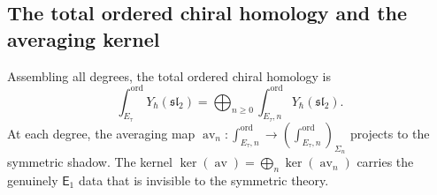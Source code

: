 \documentclass[11pt,reqno]{amsart}
\theoremstyle{definition}
\theoremstyle{remark}
\newcommand{\Eone}{\mathsf{E}_{1}}
\DeclareMathOperator{\av}{av}
\numberwithin{equation}{section}
\begin{document}
\subsection{The total ordered chiral homology and the
averaging kernel}
\label{subsec:ell-total}

Assembling all degrees, the total ordered chiral homology is
\begin{equation}\label{eq:ell-total}
  \int_{E_\tau}^{\mathrm{ord}}
  Y_\hbar(\mathfrak{sl}_2)
  = \bigoplus_{n \geq 0}
  \int_{E_\tau, n}^{\mathrm{ord}}
  Y_\hbar(\mathfrak{sl}_2).
\end{equation}
At each degree, the averaging map
$\av_n \colon \int_{E_\tau, n}^{\mathrm{ord}}
\to (\int_{E_\tau, n}^{\mathrm{ord}})_{\Sigma_n}$
projects to the symmetric shadow. The kernel
$\ker(\av) = \bigoplus_n \ker(\av_n)$ carries the
genuinely $\Eone$ data that is invisible to the symmetric
theory.
\end{document}
